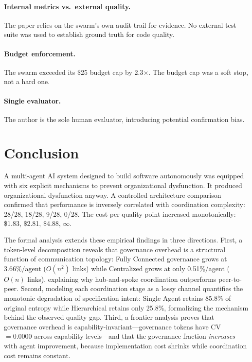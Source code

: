 \documentclass[11pt,a4paper]{article}
\begin{document}
\paragraph{Internal metrics vs.\ external quality.} The paper relies on the swarm's own audit trail for evidence. No external test suite was used to establish ground truth for code quality.

\paragraph{Budget enforcement.} The swarm exceeded its \$25 budget cap by 2.3$\times$. The budget cap was a soft stop, not a hard one.

\paragraph{Single evaluator.} The author is the sole human evaluator, introducing potential confirmation bias.


\section{Conclusion}
\label{sec:conclusion}

A multi-agent AI system designed to build software autonomously was equipped with six explicit mechanisms to prevent organizational dysfunction. It produced organizational dysfunction anyway. A controlled architecture comparison confirmed that performance is inversely correlated with coordination complexity: 28/28, 18/28, 9/28, 0/28. The cost per quality point increased monotonically: \$1.83, \$2.81, \$4.88, $\infty$.

The formal analysis extends these empirical findings in three directions. First, a token-level decomposition reveals that governance overhead is a structural function of communication topology: Fully Connected governance grows at 3.66\%/agent ($O(n^2)$ links) while Centralized grows at only 0.51\%/agent ($O(n)$ links), explaining why hub-and-spoke coordination outperforms peer-to-peer. Second, modeling each coordination stage as a lossy channel quantifies the monotonic degradation of specification intent: Single Agent retains 85.8\% of original entropy while Hierarchical retains only 25.8\%, formalizing the mechanism behind the observed quality gap. Third, a frontier analysis proves that governance overhead is capability-invariant---governance tokens have CV $= 0.0000$ across capability levels---and that the governance fraction \emph{increases} with agent improvement, because implementation cost shrinks while coordination cost remains constant.
\end{document}
